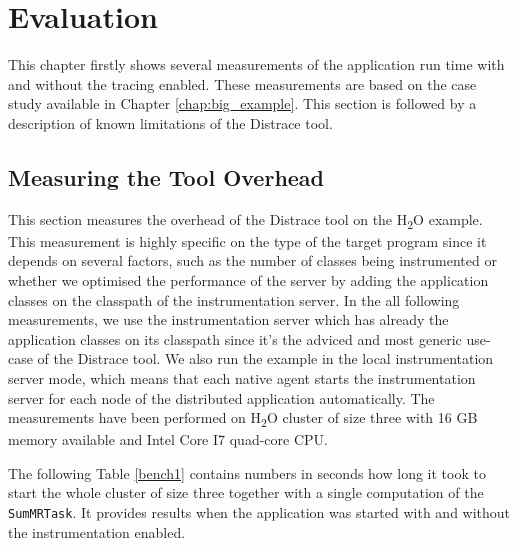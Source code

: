\chapter{Evaluation}
\label{chap:evaluation}
This chapter firstly shows several measurements of the application run time with and without the tracing enabled. These measurements are based on the case study available in Chapter \ref{chap:big_example}. This section is followed by a description of known limitations of the Distrace tool.

\section{Measuring the Tool Overhead}
This section measures the overhead of the Distrace tool on the H\textsubscript{2}O example.  This measurement is highly specific on the type of the target program since it depends on several factors, such as the number of classes being instrumented or whether we optimised the performance of the server by adding the application classes on the classpath of the instrumentation server. In the all following measurements, we use the instrumentation server which has already the application classes on its classpath since it's the adviced and most generic use-case of the Distrace tool. We also run the example in the local instrumentation server mode, which means that each native agent starts the instrumentation server for each node of the distributed application automatically. The measurements have been performed on H\textsubscript{2}O cluster of size three with 16 GB memory available and Intel Core I7 quad-core CPU.

The following Table \ref{bench1} contains numbers in seconds how long it took to start the whole cluster of size three together with a single computation of the \texttt{SumMRTask}. It provides results when the application was started with and without the instrumentation enabled.

